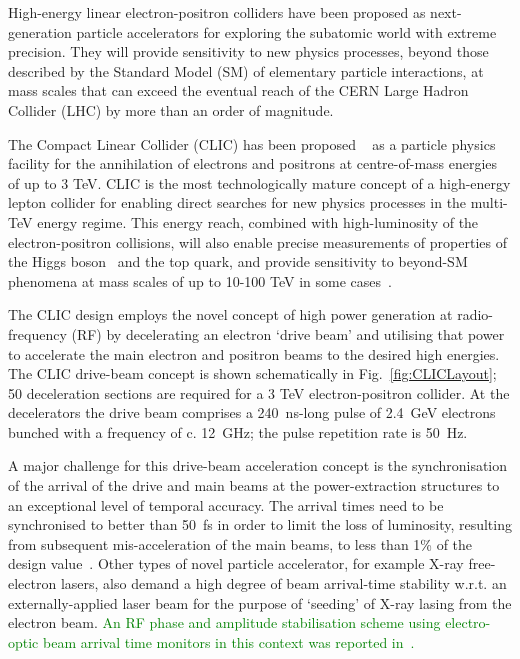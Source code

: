 \documentclass[%
 reprint,
 superscriptaddress,
 amsmath,
 amssymb,
 prl,
]{revtex4-1}
\begin{document}
\maketitle


High-energy linear electron-positron colliders have been proposed as 
next-generation particle accelerators for exploring the subatomic world with 
extreme precision. They will provide sensitivity to new physics processes, 
beyond those described by the Standard Model (SM) of elementary particle 
interactions, at mass scales that can exceed the eventual reach of the CERN 
Large Hadron Collider (LHC) by more than an order of magnitude. 

The Compact Linear Collider (CLIC) has been proposed ~\cite{CLICCDR} as a 
particle physics facility for the annihilation of electrons and positrons at 
centre-of-mass energies of up to 3 TeV. CLIC is the most technologically mature 
concept of a high-energy lepton collider for enabling direct searches for new 
physics processes in the multi-TeV energy regime. This energy reach, combined 
with high-luminosity of the electron-positron collisions, will also enable 
precise measurements of properties of the Higgs boson~\cite{CLIC-Higgs} and the 
top quark, and provide sensitivity to beyond-SM phenomena at mass scales of up 
to 10-100 TeV in some cases~\cite{CLIC-staging}.

The CLIC design employs the novel concept of high power generation at 
radio-frequency (RF) by decelerating an electron ‘drive beam’ and utilising 
that power to accelerate the main electron and positron beams to the desired 
high energies. The CLIC drive-beam concept is shown schematically in 
Fig.~\ref{fig:CLICLayout}; 50 deceleration sections are required for a 3 TeV 
electron-positron collider. At the decelerators the drive beam comprises a 
240~ns-long pulse of 2.4~GeV electrons bunched with a frequency of c. 12~GHz; 
the pulse repetition rate is 50~Hz.

A major challenge for this drive-beam acceleration concept is 
the synchronisation of the arrival of the drive and main beams at the 
power-extraction structures to an exceptional level of temporal accuracy. The 
arrival times need to be synchronised to better than 50~fs in order to limit 
the loss of luminosity, resulting from subsequent mis-acceleration of the main 
beams, to less than 1\% of the design value~\cite{Gerber2015}. Other types of 
novel particle accelerator, for example X-ray free-electron lasers, also 
demand a high degree of beam arrival-time stability w.r.t. an 
externally-applied laser beam for the purpose of ‘seeding’ of X-ray lasing from 
the electron beam. \textcolor{green}{An RF phase and amplitude stabilisation 
scheme using 
electro-optic beam arrival time monitors in this context was reported 
in~\cite{flashPRL}.}
\end{document}
